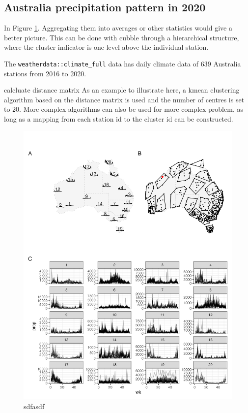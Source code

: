 \documentclass[
]{jss}
\begin{document}
\hypertarget{australia-precipitation-pattern-in-2020}{%
\subsection{Australia precipitation pattern in
2020}\label{australia-precipitation-pattern-in-2020}}

In Figure \ref{fig:basic-agg}. Aggregating them into averages or other
statistics would give a better picture. This can be done with cubble
through a hierarchical structure, where the cluster indicator is one
level above the individual station.

The \texttt{weatherdata::climate\_full} data has daily climate data of
639 Australia stations from 2016 to 2020.

calcluate distance matrix As an example to illustrate here, a kmean
clustering algorithm based on the distance matrix is used and the number
of centres is set to 20. More complex algorithms can also be used for
more complex problem, as long as a mapping from each station id to the
cluster id can be constructed.

\begin{CodeChunk}
\begin{figure}

{\centering \includegraphics[width=1\linewidth,height=0.9\textheight]{figures/basic-agg} 

}

\caption[sdfasdf]{sdfasdf}\label{fig:basic-agg}
\end{figure}
\end{CodeChunk}
\end{document}
